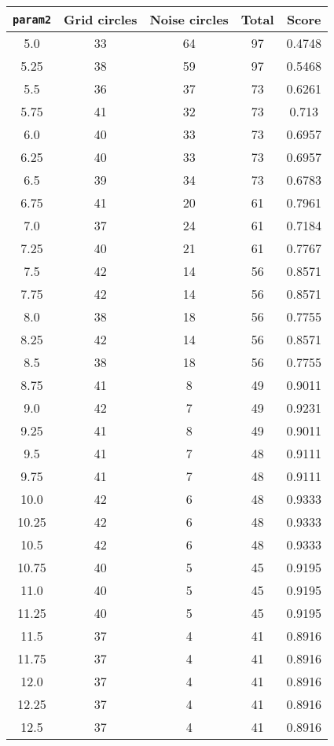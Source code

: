 \documentclass[letterpaper, 12pt]{article}
\begin{document}
\begin{longtable}{|c|c|c|c|c|}
\hline
\textbf{\texttt{param2}} & \textbf{Grid circles} & \textbf{Noise circles} & \textbf{Total} & \textbf{Score} \\
\hline
5.0 & 33 & 64 & 97 & 0.4748 \\
\hline
5.25 & 38 & 59 & 97 & 0.5468 \\
\hline
5.5 & 36 & 37 & 73 & 0.6261 \\
\hline
5.75 & 41 & 32 & 73 & 0.713 \\
\hline
6.0 & 40 & 33 & 73 & 0.6957 \\
\hline
6.25 & 40 & 33 & 73 & 0.6957 \\
\hline
6.5 & 39 & 34 & 73 & 0.6783 \\
\hline
6.75 & 41 & 20 & 61 & 0.7961 \\
\hline
7.0 & 37 & 24 & 61 & 0.7184 \\
\hline
7.25 & 40 & 21 & 61 & 0.7767 \\
\hline
7.5 & 42 & 14 & 56 & 0.8571 \\
\hline
7.75 & 42 & 14 & 56 & 0.8571 \\
\hline
8.0 & 38 & 18 & 56 & 0.7755 \\
\hline
8.25 & 42 & 14 & 56 & 0.8571 \\
\hline
8.5 & 38 & 18 & 56 & 0.7755 \\
\hline
8.75 & 41 & 8 & 49 & 0.9011 \\
\hline
9.0 & 42 & 7 & 49 & 0.9231 \\
\hline
9.25 & 41 & 8 & 49 & 0.9011 \\
\hline
9.5 & 41 & 7 & 48 & 0.9111 \\
\hline
9.75 & 41 & 7 & 48 & 0.9111 \\
\hline
10.0 & 42 & 6 & 48 & 0.9333 \\
\hline
10.25 & 42 & 6 & 48 & 0.9333 \\
\hline
10.5 & 42 & 6 & 48 & 0.9333 \\
\hline
10.75 & 40 & 5 & 45 & 0.9195 \\
\hline
11.0 & 40 & 5 & 45 & 0.9195 \\
\hline
11.25 & 40 & 5 & 45 & 0.9195 \\
\hline
11.5 & 37 & 4 & 41 & 0.8916 \\
\hline
11.75 & 37 & 4 & 41 & 0.8916 \\
\hline
12.0 & 37 & 4 & 41 & 0.8916 \\
\hline
12.25 & 37 & 4 & 41 & 0.8916 \\
\hline
12.5 & 37 & 4 & 41 & 0.8916 \\

\end{longtable}
\end{document}
